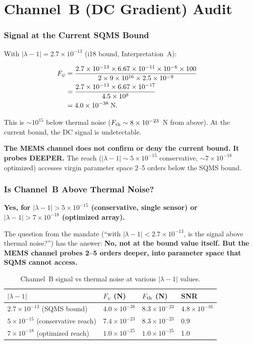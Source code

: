 \documentclass[11pt]{article}
\newcommand{\ee}[1]{\times 10^{#1}}
\newcommand{\lbone}{|\lambda - 1|}
\theoremstyle{definition}
\theoremstyle{remark}
\begin{document}
\part{Channel~B (DC Gradient) Audit}
\label{part:channelb}


\section{Signal at the Current SQMS Bound}

With $\lbone = 2.7\ee{-13}$ (i18 bound, Interpretation~A):

\begin{align}
F_\psi &= \frac{2.7\ee{-13} \times 6.67\ee{-11} \times 10^{-6}
\times 100}{2 \times 9\ee{16} \times 2.5\ee{-9}} \notag \\
&= \frac{2.7\ee{-13} \times 6.67\ee{-17}}{4.5\ee{8}} \notag \\
&= 4.0\ee{-38}\;\text{N}.
\end{align}

This is $\sim 10^{15}$ below thermal noise ($F_{\rm th}
\sim 8\ee{-23}$~N from above). At the current bound, the DC
signal is undetectable.

\textbf{The MEMS channel does not confirm or deny the current
bound. It probes DEEPER.} The reach ($\lbone \sim 5\ee{-15}$
conservative, $\sim 7\ee{-18}$ optimized) accesses virgin
parameter space 2--5 orders below the SQMS bound.


\section{Is Channel~B Above Thermal Noise?}

\textbf{Yes, for $\lbone > 5\ee{-15}$ (conservative, single sensor)
or $\lbone > 7\ee{-18}$ (optimized array).}

The question from the mandate (``with $\lbone < 2.7\ee{-13}$, is the
signal above thermal noise?'') has the answer: \textbf{No, not at the
bound value itself. But the MEMS channel probes 2--5 orders deeper,
into parameter space that SQMS cannot access.}

\begin{table}[H]
\centering
\caption{Channel~B signal vs thermal noise at various $\lbone$ values.}
\renewcommand{\arraystretch}{1.3}
\begin{tabular}{@{}llll@{}}
\toprule
$\lbone$ & $F_\psi$ (N) & $F_{\rm th}$ (N) & SNR \\
\midrule
$2.7\ee{-13}$ (SQMS bound) & $4.0\ee{-38}$ & $8.3\ee{-23}$
& $4.8\ee{-16}$ \\
$5\ee{-15}$ (conservative reach) & $7.4\ee{-23}$ & $8.3\ee{-23}$
& 0.9 \\
$7\ee{-18}$ (optimized reach) & $1.0\ee{-25}$ & $1.0\ee{-25}$
& 1.0 \\
\bottomrule
\end{tabular}
\end{table}
\end{document}
